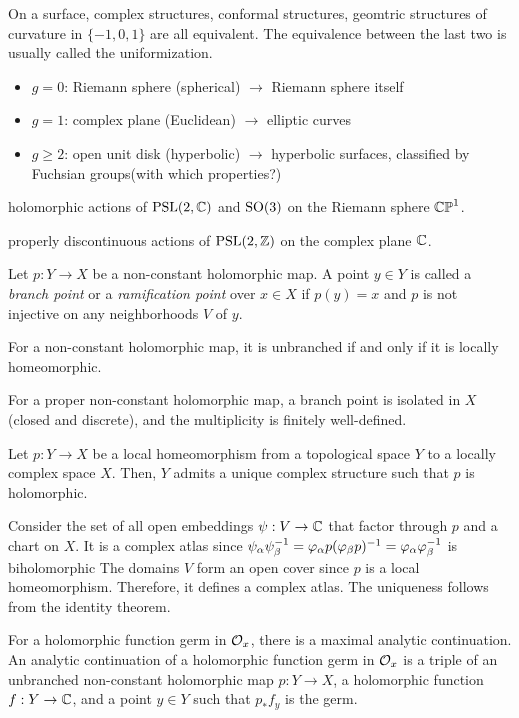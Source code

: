 \documentclass{../../large}
\begin{document}
On a surface, complex structures, conformal structures, geomtric structures of curvature in $\{-1,0,1\}$ are all equivalent.
The equivalence between the last two is usually called the uniformization.





\begin{itemize}
\item $g=0$: Riemann sphere (spherical) $\to$ Riemann sphere itself
\item $g=1$: complex plane (Euclidean) $\to$ elliptic curves
\item $g\ge2$: open unit disk (hyperbolic) $\to$ hyperbolic surfaces, classified by Fuchsian groups(with which properties?)
\end{itemize}

\begin{prb}
holomorphic actions of $\mathrm{PSL}(2,\mathbb{C})$ and $\mathrm{SO}(3)$ on the Riemann sphere $\mathbb{CP}^1$.

properly discontinuous actions of $\mathrm{PSL}(2,\mathbb{Z})$ on the complex plane $\mathbb{C}$.
\end{prb}

Let $p:Y\to X$ be a non-constant holomorphic map.
A point $y\in Y$ is called a \emph{branch point} or a \emph{ramification point} over $x\in X$ if $p(y)=x$ and $p$ is not injective on any neighborhoods $V$ of $y$.

For a non-constant holomorphic map, it is unbranched if and only if it is locally homeomorphic.

For a proper non-constant holomorphic map, a branch point is isolated in $X$ (closed and discrete), and the multiplicity is finitely well-defined.

\begin{prb}
Let $p:Y\to X$ be a local homeomorphism from a topological space $Y$ to a locally complex space $X$.
Then, $Y$ admits a unique complex structure such that $p$ is holomorphic.
\end{prb}
\begin{pf}
Consider the set of all open embeddings $\psi:V\to\mathbb{C}$ that factor through $p$ and a chart on $X$.
It is a complex atlas since $\psi_\alpha\psi_\beta^{-1}=\varphi_\alpha p(\varphi_\beta p)^{-1}=\varphi_\alpha\varphi_\beta^{-1}$ is biholomorphic
The domains $V$ form an open cover since $p$ is a local homeomorphism.
Therefore, it defines a complex atlas.
The uniqueness follows from the identity theorem.
\end{pf}


For a holomorphic function germ in $\mathcal{O}_x$, there is a maximal analytic continuation.
An analytic continuation of a holomorphic function germ in $\mathcal{O}_x$ is a triple of an unbranched non-constant holomorphic map $p:Y\to X$, a holomorphic function $f:Y\to\mathbb{C}$, and a point $y\in Y$ such that $p_*f_y$ is the germ.
\end{document}
